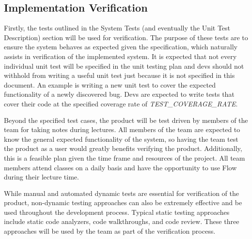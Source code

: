\documentclass[12pt, titlepage]{article}
\begin{document}


\subsection{Implementation Verification}




Firstly, the tests outlined in the System Tests (and eventually the Unit Test
Description) section will be used for verification. The purpose of these tests
are to ensure the system behaves as expected given the specification, which
naturally assists in verification of the implemented system. It is expected
that not every individual unit test will be specified in the unit testing plan
and devs should not withhold from writing a useful unit test just because it is
not specified in this document. An example is writing a new unit test to cover
the expected functionality of a newly discovered bug. Devs are expected to
write tests that cover their code at the specified coverage rate of
\textit{TEST\_COVERAGE\_RATE}.

Beyond the specified test cases, the product will be test driven by members
of the team for taking notes during lectures. All members of the team are
expected to know the general expected functionality of the system, so having
the team test the product as a user would greatly benefits verifying the
product. Additionally, this is a feasible plan given the time frame and
resources of the project. All team members attend classes on a daily basis and
have the opportunity to use Flow during their lecture time.

While manual and automated dynamic tests are essential for verification of the
product, non-dynamic testing approaches can also be extremely effective and be
used throughout the development process. Typical static testing approaches
include static code analyzers, code walkthroughs, and code review. These three
approaches will be used by the team as part of the verification process.
\end{document}
